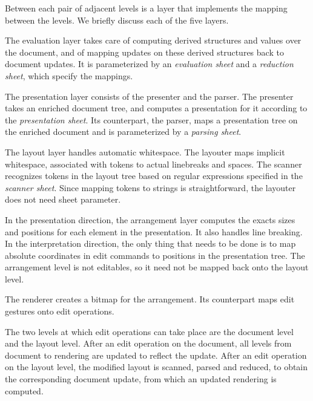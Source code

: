 \documentclass[12pt]{article}
\begin{document}
Between each pair of adjacent levels is a layer that implements the mapping between the levels. We briefly discuss each of the five layers.

\noindent The evaluation layer takes care of computing derived structures and values over the document, and of mapping updates on these derived structures back to document updates. It is parameterized by an {\em evaluation sheet} and a {\em reduction sheet}, which specify the mappings. 

\noindent The presentation layer consists of the presenter and the parser. The presenter takes an enriched document tree, and computes a presentation for it according to the {\em presentation sheet}. Its counterpart, the parser, maps a presentation tree on the enriched document and is parameterized by a {\em parsing sheet}.

\noindent The layout layer handles automatic whitespace. The layouter maps implicit whitespace, associated with tokens to actual linebreaks and spaces. The scanner recognizes tokens in the layout tree based on regular expressions specified in the {\em scanner sheet}. Since mapping tokens to strings is straightforward, the layouter does not need sheet parameter.

\noindent In the presentation direction, the arrangement layer computes the exacts sizes and positions for each element in the presentation. It also handles line breaking. In the interpretation direction, the only thing that needs to be done is to map absolute coordinates in edit commands to positions in the presentation tree. The arrangement level is not editables, so it need not be mapped back onto the layout level.

\noindent The renderer creates a bitmap for the arrangement. Its counterpart maps edit gestures onto edit operations.


The two levels at which edit operations can take place are the document level and the layout level. After an edit operation on the document, all levels from document to rendering are updated to reflect the update. After an edit operation on the layout level, the modified layout is scanned, parsed and reduced, to obtain the corresponding document update, from which an updated rendering is computed. 
\end{document}

